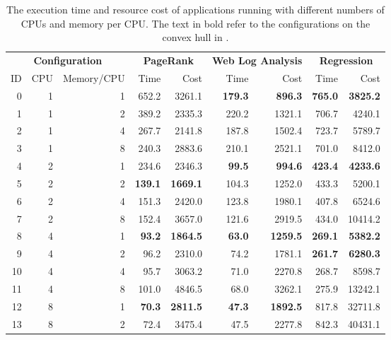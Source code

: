 \begin{table}[!htbp]
\centering
\caption{The execution time and resource cost of applications
running with different numbers of CPUs and memory per CPU.
The text in bold refer to the configurations on the convex hull
in \myfigure{\ref{fig:application_performance}}.}
\label{table:raw_data}
\begin{tabular}{rrrrrrrrr}
\multicolumn{3}{c}{\textbf{Configuration}}  & \multicolumn{2}{c}{\textbf{PageRank}} & \multicolumn{2}{c}{\textbf{Web Log Analysis}} & \multicolumn{2}{c}{\textbf{Regression}}\\
ID  & CPU & Memory/CPU & Time & Cost & Time & Cost & Time & Cost \\ \hline \hline
0   & 1          & 1       & 652.2 & 3261.1  & \textbf{179.3} & \textbf{896.3}  & \textbf{765.0}  & \textbf{3825.2} \\
1   & 1          & 2       & 389.2 & 2335.3  & 220.2 & 1321.1 & 706.7  & 4240.1 \\
2   & 1          & 4       & 267.7 & 2141.8  & 187.8 & 1502.4 & 723.7  & 5789.7 \\
3   & 1          & 8       & 240.3 & 2883.6  & 210.1 & 2521.1 & 701.0  & 8412.0 \\ \hline
4   & 2          & 1       & 234.6 & 2346.3  & \textbf{99.5}  & \textbf{994.6}  & \textbf{423.4}  & \textbf{4233.6} \\
5   & 2          & 2       & \textbf{139.1} & \textbf{1669.1}  & 104.3 & 1252.0 & 433.3  & 5200.1 \\
6   & 2          & 4       & 151.3 & 2420.0  & 123.8 & 1980.1 & 407.8  & 6524.6 \\
7   & 2          & 8       & 152.4 & 3657.0  & 121.6 & 2919.5 & 434.0  & 10414.2 \\ \hline
8   & 4          & 1       & \textbf{93.2}  & \textbf{1864.5}  & \textbf{63.0}  & \textbf{1259.5} & \textbf{269.1}  & \textbf{5382.2} \\
9   & 4          & 2       & 96.2  & 2310.0  & 74.2  & 1781.1 & \textbf{261.7}  & \textbf{6280.3} \\
10  & 4          & 4       & 95.7  & 3063.2  & 71.0  & 2270.8 & 268.7  & 8598.7 \\
11  & 4          & 8       & 101.0 & 4846.5  & 68.0  & 3262.1 & 275.9  & 13242.1 \\ \hline
12  & 8          & 1       & \textbf{70.3}  & \textbf{2811.5}  & \textbf{47.3}  & \textbf{1892.5} & 817.8  & 32711.8 \\
13  & 8          & 2       & 72.4  & 3475.4  & 47.5  & 2277.8 & 842.3  & 40431.1 \\

\end{tabular}
\end{table}
